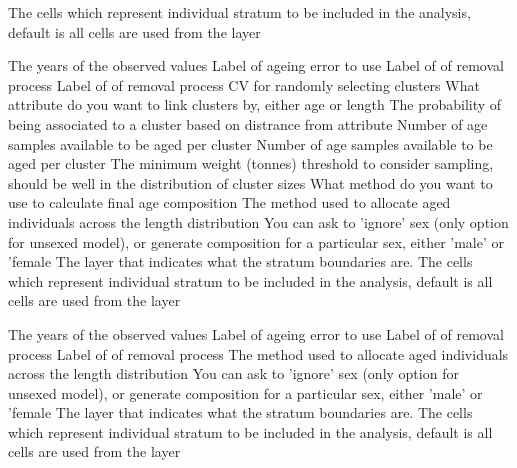  {The cells which represent individual stratum to be included in the analysis, default is all cells are used from the layer}
\par\textbf{}\par
{} {The years of the observed values}
 {Label of ageing error to use}
 {Label of of removal process}
 {Label of of removal process}
 {CV for randomly selecting clusters}
 {What attribute do you want to link clusters by, either age or length}
 {The probability of being associated to a cluster based on distrance from attribute}
 {Number of age samples available to be aged per cluster}
 {Number of age samples available to be aged per cluster}
 {The minimum weight (tonnes) threshold to consider sampling, should be well in the distribution of cluster sizes}
 {What method do you want to use to calculate final age composition}
 {The method used to allocate aged individuals across the length distribution}
 {You can ask to 'ignore' sex (only option for unsexed model), or generate composition for a particular sex, either 'male' or 'female}
 {The layer that indicates what the stratum boundaries are.}
 {The cells which represent individual stratum to be included in the analysis, default is all cells are used from the layer}
\par\textbf{}\par
{} {The years of the observed values}
 {Label of ageing error to use}
 {Label of of removal process}
 {Label of of removal process}
 {The method used to allocate aged individuals across the length distribution}
 {You can ask to 'ignore' sex (only option for unsexed model), or generate composition for a particular sex, either 'male' or 'female}
 {The layer that indicates what the stratum boundaries are.}
 {The cells which represent individual stratum to be included in the analysis, default is all cells are used from the layer}

